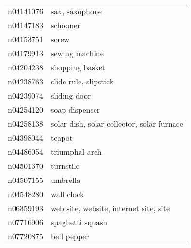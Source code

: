 \begin{appendices}
\begin{longtabu}{X|X[4]}
    		n04141076 &                                                                                                             sax, saxophone \tabularnewline
    		n04147183 &                                                                                                                   schooner \tabularnewline
    		n04153751 &                                                                                                                      screw \tabularnewline
    		n04179913 &                                                                                                             sewing machine \tabularnewline
    		n04204238 &                                                                                                            shopping basket \tabularnewline
    		n04238763 &                                                                                                      slide rule, slipstick \tabularnewline
    		n04239074 &                                                                                                               sliding door \tabularnewline
    		n04254120 &                                                                                                             soap dispenser \tabularnewline
    		n04258138 &                                                                                 solar dish, solar collector, solar furnace \tabularnewline
    		n04398044 &                                                                                                                     teapot \tabularnewline
    		n04486054 &                                                                                                             triumphal arch \tabularnewline
    		n04501370 &                                                                                                                  turnstile \tabularnewline
    		n04507155 &                                                                                                                   umbrella \tabularnewline
    		n04548280 &                                                                                                                 wall clock \tabularnewline
    		n06359193 &                                                                                     web site, website, internet site, site \tabularnewline
    		n07716906 &                                                                                                           spaghetti squash \tabularnewline
    		n07720875 &                                                                                                                bell pepper \tabularnewline

\end{longtabu}
\end{appendices}
